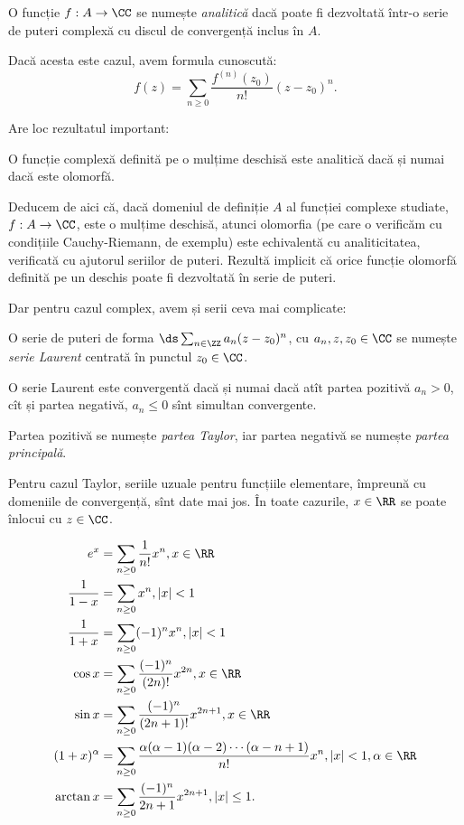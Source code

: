 \begin{definition}\label{def:analitica}
  O funcție $ f : A \to \CC $ se numește \emph{analitică} dacă poate fi
  dezvoltată într-o serie de puteri complexă cu discul de convergență
  inclus în $ A $.
\end{definition}

Dacă acesta este cazul, avem formula cunoscută:
\[
  f(z) = \sum_{n \geq 0} \dfrac{f^{(n)}(z_0)}{n!} (z - z_0)^n.
\]

Are loc rezultatul important:
\begin{theorem}\label{thm:wrc}
  O funcție complexă definită pe o mulțime deschisă este analitică dacă și
  numai dacă este olomorfă.
\end{theorem}

Deducem de aici că, dacă domeniul de definiție $ A $ al funcției complexe
studiate, $ f : A \to \CC $, este o mulțime deschisă, atunci olomorfia
(pe care o verificăm cu condițiile Cauchy-Riemann, de exemplu) este echivalentă
cu analiticitatea, verificată cu ajutorul seriilor de puteri. Rezultă
implicit că orice funcție olomorfă definită pe un deschis poate fi dezvoltată
în serie de puteri.

Dar pentru cazul complex, avem și serii ceva mai complicate:
\begin{definition}\label{def:laurent}
  O serie de puteri de forma $ \ds\sum_{n \in \ZZ} a_n(z - z_0)^n $,
  cu $ a_n, z, z_0 \in \CC $ se numește \emph{serie Laurent} centrată în
  punctul $ z_0 \in \CC $.
\end{definition}

O serie Laurent este convergentă dacă și numai dacă atît partea pozitivă
$ a_n > 0 $, cît și partea negativă, $ a_n \leq 0 $ sînt simultan convergente.

Partea pozitivă se numește \emph{partea Taylor}, iar partea negativă se numește
\emph{partea principală}.

Pentru cazul Taylor, seriile uzuale pentru funcțiile elementare, împreună cu domeniile
de convergență, sînt date mai jos. În toate cazurile, $ x \in \RR $ se poate înlocui
cu $ z \in \CC $.

\begin{align*}
  e^x &= \sum_{n \geq 0} \dfrac{1}{n!} x^n, x \in \RR \\
  \dfrac{1}{1 - x} &= \sum_{n \geq 0} x^n, |x| < 1 \\
  \dfrac{1}{1 + x} &= \sum_{n \geq 0} (-1)^n x^n, |x| < 1 \\
  \cos x &= \sum_{n \geq 0} \dfrac{(-1)^n}{(2n)!} x^{2n}, x \in \RR \\
  \sin x &= \sum_{n \geq 0} \dfrac{(-1)^n}{(2n + 1)!} x^{2n + 1}, x \in \RR \\
  (1 + x)^\alpha &= \sum_{n \geq 0} \dfrac{\alpha(\alpha - 1)(\alpha - 2) \cdots (\alpha - n + 1)}{n!} x^n,%
                   |x| < 1, \alpha \in \RR \\
  \arctan x &= \sum_{n \geq 0} \dfrac{(-1)^n}{2n + 1} x^{2n + 1}, | x | \leq 1.
\end{align*}

